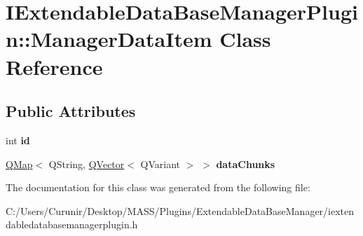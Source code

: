 \hypertarget{class_i_extendable_data_base_manager_plugin_1_1_manager_data_item}{}\section{I\+Extendable\+Data\+Base\+Manager\+Plugin\+:\+:Manager\+Data\+Item Class Reference}
\label{class_i_extendable_data_base_manager_plugin_1_1_manager_data_item}
\subsection*{Public Attributes}
\begin{DoxyCompactItemize}
\item 
\mbox{\label{class_i_extendable_data_base_manager_plugin_1_1_manager_data_item_abd5e8e3ceaa0d584593b9afc7bd4d4e3}} 
int {\bfseries id}
\item 
\mbox{\label{class_i_extendable_data_base_manager_plugin_1_1_manager_data_item_a1dcb37adfd0b55f67ddf2b1ecfa7a081}} 
\hyperlink{class_q_map}{Q\+Map}$<$ Q\+String, \hyperlink{class_q_vector}{Q\+Vector}$<$ Q\+Variant $>$ $>$ {\bfseries data\+Chunks}
\end{DoxyCompactItemize}


The documentation for this class was generated from the following file\+:\begin{DoxyCompactItemize}
\item 
C\+:/\+Users/\+Curunir/\+Desktop/\+M\+A\+S\+S/\+Plugins/\+Extendable\+Data\+Base\+Manager/iextendabledatabasemanagerplugin.\+h\end{DoxyCompactItemize}

